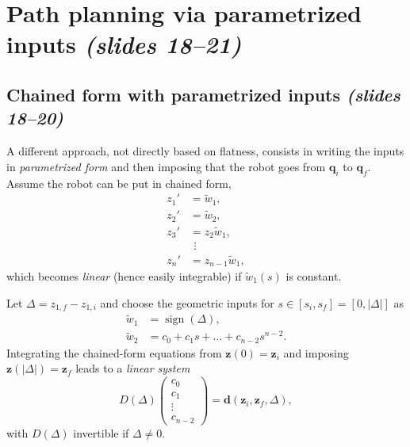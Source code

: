 \documentclass[11pt,a4paper]{article}
\newcommand{\qi}{\boldsymbol{q}_i}
\newcommand{\qf}{\boldsymbol{q}_f}
\newcommand{\wwt}{\tilde w}
\newcommand{\sign}{\operatorname{sign}}
\theoremstyle{definition}
\theoremstyle{plain}
\theoremstyle{remark}
\begin{document}
\section{Path planning via parametrized inputs \emph{(slides 18--21)}}

\subsection{Chained form with parametrized inputs \emph{(slides 18--20)}}

A different approach, not directly based on flatness, consists in writing the inputs in \emph{parametrized form} and then
imposing that the robot goes from $\qi$ to $\qf$. Assume the robot can be put in chained form,
\begin{align}
z_1'&=\wwt_1,\nonumber\\
z_2'&=\wwt_2,\nonumber\\
z_3'&=z_2\wwt_1,\\
&\ \,\vdots\nonumber\\
z_n'&=z_{n-1}\wwt_1,\nonumber
\end{align}
which becomes \emph{linear} (hence easily integrable) if $\wwt_1(s)$ is constant.

Let $\Delta=z_{1,f}-z_{1,i}$ and choose the geometric inputs for $s\in[s_i,s_f]=[0,|\Delta|]$ as
\begin{align}
\wwt_1&=\sign(\Delta),\\
\wwt_2&=c_0+c_1s+\dots+c_{n-2}s^{n-2}.
\end{align}
Integrating the chained-form equations from $\boldsymbol z(0)=\boldsymbol z_i$ and imposing $\boldsymbol z(|\Delta|)=\boldsymbol z_f$ leads to a
\emph{linear system}
\begin{equation}
D(\Delta)\begin{pmatrix}c_0\\c_1\\\vdots\\c_{n-2}\end{pmatrix}=\boldsymbol d(\boldsymbol z_i,\boldsymbol z_f,\Delta),
\end{equation}
with $D(\Delta)$ invertible if $\Delta\ne0$.
\end{document}
